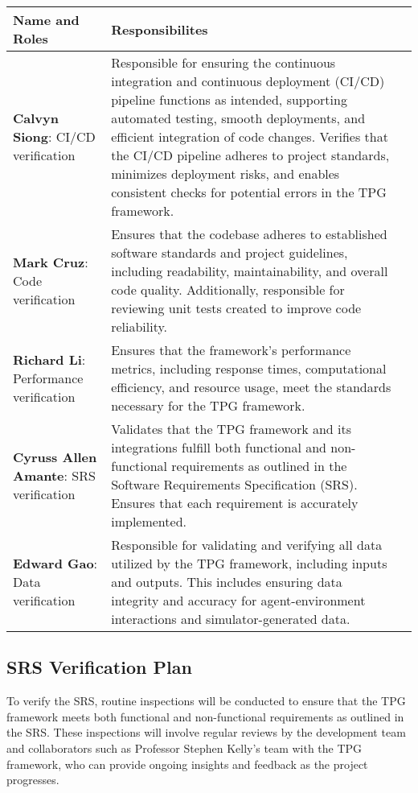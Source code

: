 \documentclass[12pt, titlepage]{article}
\begin{document}
\begin{tabularx}{\textwidth}{p{5cm}p{8cm}X}
  \toprule {\bf Name and Roles} & {\bf Responsibilites}\\
  \midrule
  {\bf Calvyn Siong}: CI/CD verification & Responsible for ensuring the continuous integration and continuous deployment (CI/CD) pipeline functions as intended, supporting automated testing, smooth deployments, and efficient integration of code changes. Verifies that the CI/CD pipeline adheres to project standards, minimizes deployment risks, and enables consistent checks for potential errors in the TPG framework.\\
  {\bf Mark Cruz}: Code verification & Ensures that the codebase adheres to established software standards and project guidelines, including readability, maintainability, and overall code quality. Additionally, responsible for reviewing unit tests created to improve code reliability.\\

  {\bf Richard Li}: Performance verification &Ensures that the framework’s performance metrics, including response times, computational efficiency, and resource usage, meet the standards necessary for the TPG framework. \\

  {\bf Cyruss Allen Amante}: SRS verification &Validates that the TPG framework and its integrations fulfill both functional and non-functional requirements as outlined in the Software Requirements Specification (SRS). Ensures that each requirement is accurately implemented.\\

  {\bf Edward Gao}: Data verification & Responsible for validating and verifying all data utilized by the TPG framework, including inputs and outputs. This includes ensuring data integrity and accuracy for agent-environment interactions and simulator-generated data.\\
  \bottomrule
  \end{tabularx}
  
  




\subsection{SRS Verification Plan}

To verify the SRS, routine inspections will be conducted to ensure that the TPG framework meets both functional and non-functional requirements as outlined in the SRS. These inspections will involve regular reviews by the development team and collaborators such as Professor Stephen Kelly’s team with the TPG framework, who can provide ongoing insights and feedback as the project progresses. 
\end{document}
